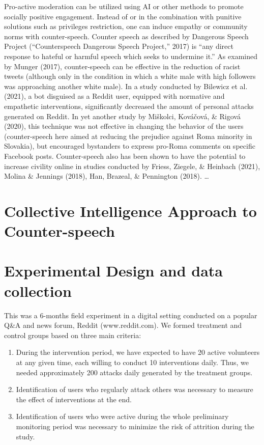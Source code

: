 \documentclass[
  10pt,
  dvipsnames,enabledeprecatedfontcommands]{scrartcl}
\begin{document}
Pro-active moderation can be utilized using AI or other methods to
promote socially positive engagement. Instead of or in the combination
with punitive solutions such as privileges restriction, one can induce
empathy or community norms with counter-speech. Counter speech as
described by Dangerous Speech Project ({``Counterspeech {{}} {Dangerous}
{Speech} {Project},''} 2017) is ``any direct response to hateful or
harmful speech which seeks to undermine it.'' As examined by Munger
(2017), counter-speech can be effective in the reduction of racist
tweets (although only in the condition in which a white male with high
followers was approaching another white male). In a study conducted by
Bilewicz et al. (2021), a bot disguised as a Reddit user, equipped with
normative and empathetic interventions, significantly decreased the
amount of personal attacks generated on Reddit. In yet another study by
Miškolci, Kováčová, \& Rigová (2020), this technique was not effective
in changing the behavior of the users (counter-speech here aimed at
reducing the prejudice against Roma minority in Slovakia), but
encouraged bystanders to express pro-Roma comments on specific Facebook
posts. Counter-speech also has been shown to have the potential to
increase civility online in studies conducted by Friess, Ziegele, \&
Heinbach (2021), Molina \& Jennings (2018), Han, Brazeal, \& Pennington
(2018). \ldots{}

\hypertarget{collective-intelligence-approach-to-counter-speech}{%
\section{Collective Intelligence Approach to
Counter-speech}\label{collective-intelligence-approach-to-counter-speech}}

\hypertarget{experimental-design-and-data-collection}{%
\section{Experimental Design and data
collection}\label{experimental-design-and-data-collection}}

This was a 6-months field experiment in a digital setting conducted on a
popular Q\&A and news forum, Reddit (www.reddit.com). We formed
treatment and control groups based on three main criteria:
\renewcommand{\labelenumii}{\Roman{enumii}}

\begin{enumerate}
 \item During the intervention period, we have expected to have 20 active volunteers at any given time, each willing to conduct 10 interventions daily. Thus, we needed approximately 200 attacks daily generated by the treatment groups.
\item Identification of users who regularly attack others was necessary to measure the effect of interventions at the end.
\item Identification of users who were active during the whole preliminary monitoring period was necessary to minimize the risk of attrition during the study. 
 \end{enumerate}
\end{document}
